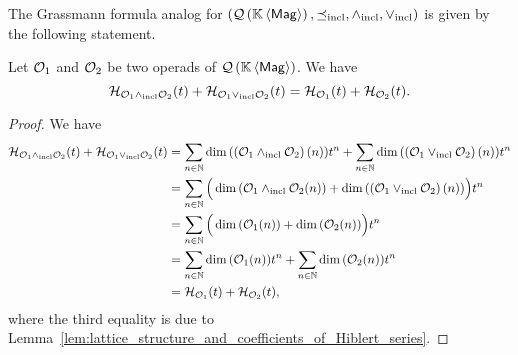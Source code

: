 The Grassmann formula analog for $\left(\mathcal{Q}\left(\mathbb{K} \left\langle\mathsf{Mag}\right\rangle\right),\preceq_{\mathrm{incl}},\wedge_{\mathrm{incl}},\vee_{\mathrm{incl}}\right)$ is given by the following
statement.
\medbreak

\begin{Theorem}
    \label{thm:Grassmann_formula_for__Hilbert_series_of_QMag}
    Let $\mathcal{O}_1$ and $\mathcal{O}_2$ be two operads of $\mathcal{Q}\left(\mathbb{K} \left\langle\mathsf{Mag}\right\rangle\right)$. We have
    \begin{equation} \label{equ:lattice_structure_and_Hiblert_series}
        \mathcal{H}_{\mathcal{O}_1\wedge_{\mathrm{incl}}\mathcal{O}_2}(t)
        +\mathcal{H}_{\mathcal{O}_1\vee_{\mathrm{incl}}\mathcal{O}_2}(t)
        =\mathcal{H}_{\mathcal{O}_1}(t)+\mathcal{H}_{\mathcal{O}_2}(t).
    \end{equation}
\end{Theorem}
\begin{proof}
    We have
    \begin{equation}\begin{split}
        \mathcal{H}_{\mathcal{O}_1\wedge_{\mathrm{incl}}\mathcal{O}_2}(t)
        +\mathcal{H}_{\mathcal{O}_1\vee_{\mathrm{incl}}\mathcal{O}_2}(t)&
        =\sum_{n\in\mathbb{N}}\dim{\left(\left(\mathcal{O}_1\wedge_{\mathrm{incl}}\mathcal{O}_2\right)(n)
            \right)}t^n
            +\sum_{n\in\mathbb{N}}\dim{\left(\left(\mathcal{O}_1\vee_{\mathrm{incl}}\mathcal{O}_2\right)
            (n)\right)}t^n\\
        &=\sum_{n\in\mathbb{N}}\Big(\dim{\left(\mathcal{O}_1\wedge_{\mathrm{incl}}\mathcal{O}_2(n)\right)}
            +\dim{\left(\left(\mathcal{O}_1\vee_{\mathrm{incl}}\mathcal{O}_2\right)(n)
        \right)}\Big)t^n\\
        &=\sum_{n\in\mathbb{N}}\Big(\dim{\left(\mathcal{O}_1(n)\right)}
            +\dim{\left(\mathcal{O}_2(n)\right)}\Big)t^n\\
        &=\sum_{n\in\mathbb{N}}\dim{\left(\mathcal{O}_1(n)\right)}t^n+\sum_{n\in\mathbb{N}}
            \dim{\left(\mathcal{O}_2(n)\right)}t^n\\
        &=\mathcal{H}_{\mathcal{O}_1}(t)+\mathcal{H}_{\mathcal{O}_2}(t),
    \end{split}\end{equation}
    where the third equality is due to
    Lemma~\ref{lem:lattice_structure_and_coefficients_of_Hiblert_series}.
\end{proof}
\medbreak

